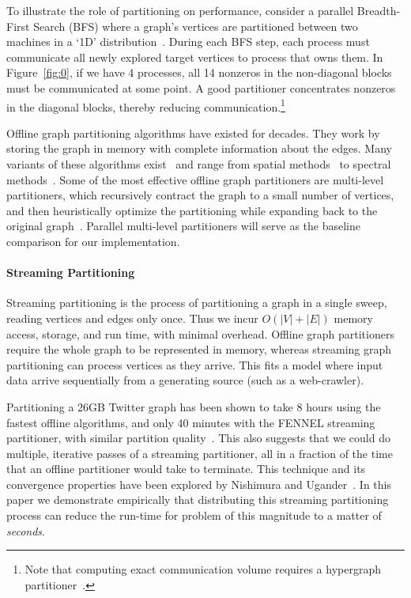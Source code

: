 To illustrate the role of partitioning on performance, consider a parallel Breadth-First Search (BFS) where a graph's vertices are partitioned between two machines in a `1D' distribution~\cite{Buluc2D}. During each BFS step, each process must communicate all newly explored target vertices to process that owns them. In Figure~\ref{fig:0}, if we have 4 processes, all 14 nonzeros in the non-diagonal blocks must be communicated at some point. A good partitioner concentrates nonzeros in the diagonal blocks, thereby reducing communication.\footnote{Note that computing exact communication volume requires a hypergraph partitioner~\cite{hypergraph}.} 

Offline graph partitioning algorithms have existed for decades. They work by storing the graph in memory with complete information about the edges. Many variants of these algorithms exist~\cite{gpsurvey} and range from spatial methods~\cite{Gilbert95geometricmesh} to spectral methods~\cite{arora2009expander}. Some of the most effective offline graph partitioners are multi-level partitioners, which recursively contract the graph to a small number of vertices, and then heuristically optimize the partitioning while expanding back to the original graph~\cite{karypis1998multilevel}. Parallel multi-level partitioners will serve as the baseline comparison for our implementation. 

\paragraph{Streaming Partitioning}
Streaming partitioning is the process of partitioning a graph in a single sweep, reading vertices and edges only once. Thus we incur $O(|V| + |E|)$ memory access, storage, and run time, with minimal overhead. Offline graph partitioners require the whole graph to be represented in memory, whereas streaming graph partitioning can process vertices as they arrive. This fits a model where input data arrive sequentially from a generating source (such as a web-crawler).

Partitioning a 26GB Twitter graph has been shown to take 8 hours using the fastest offline algorithms, and only 40 minutes with the FENNEL streaming partitioner, with similar partition quality~\cite{tsourakakis2012fennel}. This also suggests that we could do multiple, iterative passes of a streaming partitioner, all in a fraction of the time that an offline partitioner would take to terminate. This technique and its convergence properties have been explored by Nishimura and Ugander~\cite{nishimura2013restream}. In this paper we demonstrate empirically that distributing this streaming partitioning process can reduce the run-time for problem of this magnitude to a matter of \emph{seconds}. 

